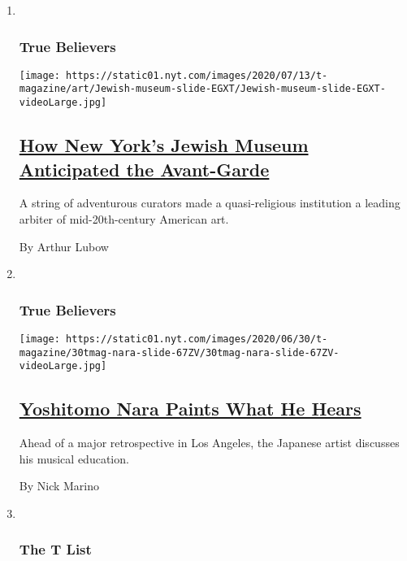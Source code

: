\begin{enumerate}
\def\labelenumi{\arabic{enumi}.}
\item ~
  \hypertarget{true-believers-3}{%
  \subsubsection{True Believers}\label{true-believers-3}}

  \texttt{[image: https://static01.nyt.com/images/2020/07/13/t-magazine/art/Jewish-museum-slide-EGXT/Jewish-museum-slide-EGXT-videoLarge.jpg]}

  \hypertarget{how-new-yorks-jewish-museum-anticipated-the-avant-garde}{%
  \subsection{\texorpdfstring{\href{/2020/07/23/t-magazine/jewish-museum-new-york.html}{How
  New York's Jewish Museum Anticipated the
  Avant-Garde}}{How New York's Jewish Museum Anticipated the Avant-Garde}}\label{how-new-yorks-jewish-museum-anticipated-the-avant-garde}}

  A string of adventurous curators made a quasi-religious institution a
  leading arbiter of mid-20th-century American art.

  By Arthur Lubow
\item ~
  \hypertarget{true-believers-4}{%
  \subsubsection{True Believers}\label{true-believers-4}}

  \texttt{[image: https://static01.nyt.com/images/2020/06/30/t-magazine/30tmag-nara-slide-67ZV/30tmag-nara-slide-67ZV-videoLarge.jpg]}

  \hypertarget{yoshitomo-nara-paints-what-he-hears}{%
  \subsection{\texorpdfstring{\href{/2020/07/24/t-magazine/yoshitomo-nara.html}{Yoshitomo
  Nara Paints What He
  Hears}}{Yoshitomo Nara Paints What He Hears}}\label{yoshitomo-nara-paints-what-he-hears}}

  Ahead of a major retrospective in Los Angeles, the Japanese artist
  discusses his musical education.

  By Nick Marino
\item ~
  \hypertarget{the-t-list}{%
  \subsubsection{The T List}\label{the-t-list}}


\end{enumerate}
